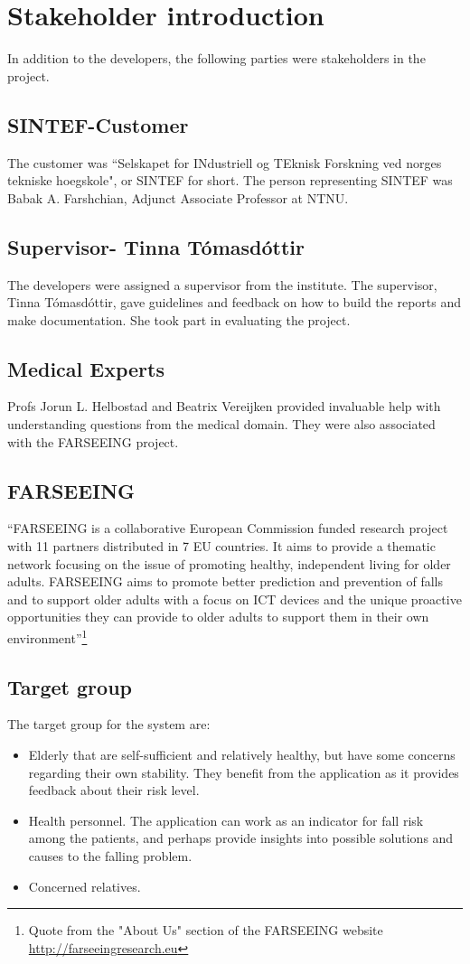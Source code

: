 \section{Stakeholder introduction}
In addition to the developers, the following parties were stakeholders in the project.
\subsection{SINTEF-Customer}
The customer was ``Selskapet for INdustriell og TEknisk Forskning ved norges tekniske hoegskole", or SINTEF for short. The person representing SINTEF was Babak A. Farshchian, Adjunct Associate Professor at NTNU.
\subsection{Supervisor- Tinna T\'{o}masd\'{o}ttir}
The developers were assigned a supervisor from the institute. The supervisor, Tinna T\'{o}masd\'{o}ttir, gave guidelines and feedback on how to build the reports and make documentation. She took part in evaluating the project. 
\subsection{Medical Experts}
Profs Jorun L. Helbostad and Beatrix Vereijken provided invaluable help with understanding questions from the medical domain. They were also associated with the FARSEEING project. 
\subsection{FARSEEING}
``FARSEEING is a collaborative European Commission funded research project with 11 partners distributed in 7 EU countries. It aims to provide a thematic network focusing on the issue of promoting healthy, independent living for older adults. FARSEEING aims to promote better prediction and prevention of falls and to support older adults with a focus on ICT devices and the unique proactive opportunities they can provide to older adults to support them in their own environment''\footnote{Quote from the "About Us" section of the FARSEEING website \url{http://farseeingresearch.eu}}

\subsection{Target group}
The target group for the system are:
\begin{itemize}
\item Elderly that are self-sufficient and relatively healthy, but have some concerns regarding their own stability. They benefit from the application as it provides feedback about their risk level.
\item Health personnel. The application can work as an indicator for fall risk among the patients, and perhaps provide insights into possible 
solutions and causes to the falling problem.
\item Concerned relatives.
\end{itemize}


